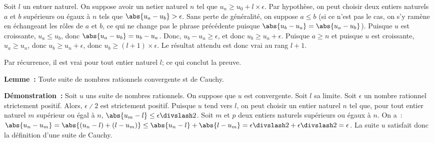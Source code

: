     Soit $l$ un entuer naturel. 
    On suppose avoir un netier naturel $n$ tel que $u_n \geq u_0 + l \times \epsilon$.
    Par hypothèse, on peut choisir deux entiers naturels $a$ et $b$ supérieurs ou égaux à $n$ tels que $\abs{u_a - u_b} > \epsilon$.
    Sans perte de généralité, on suppose $a \leq b$ (si ce n'est pas le cas, on s'y ramène en échangeant les rôles de $a$ et $b$, ce qui ne change pas le phrase précédente puisque $\abs{u_b - u_a} = \abs{u_a - u_b}$).
    Puisque $u$ est croissante, $u_a \leq u_b$, donc $\abs{u_a - u_b} = u_b - u_a$.
    Donc, $u_b - u_a \geq \epsilon$, et donc $u_b \geq u_a + \epsilon$.
    Puisque $a \geq n$ et puisque $u$ est croissante, $u_a \geq u_n$, donc $u_b \geq u_n + \epsilon$, donc $u_b \geq (l+1) \times \epsilon$.
    Le résultat attendu est donc vrai au rang $l+1$. 

    Par récurrence, il est vrai pour tout entier naturel $l$; ce qui conclut la preuve.

    \done

\medskip

\noindent\textbf{Lemme :} Toute suite de nombres rationnels convergente st de Cauchy. 

\medskip

\noindent\textbf{Démonstration :} Soit $u$ uns suite de nombres rationnels.
    On suppose que $u$ est convergente. 
    Soit $l$ sa limite. 
    Soit $\epsilon$ un nombre rationnel strictement positif. 
    Alors, $\epsilon \divslash 2$ est strictement positif.
    Puisque $u$ tend vers $l$, on peut choisir un entier naturel $n$ tel que, pour tout entier naturel $m$ supérieur ou égal à $n$, $\abs{u_m - l} \leq \epsilon \divslash 2$. 
    Soit $m$ et $p$ deux entiers naturels supérieurs ou égaux à $n$. 
    On a : $\abs{u_n - u_m} = \abs{(u_n - l) + (l - u_m)} \leq \abs{u_n - l} + \abs{l - u_m} = \epsilon \divslash 2 + \epsilon \divslash 2 = \epsilon$. 
    La suite $u$ satisfait donc la définition d'une suite de Cauchy. 

    \done

\medskip

